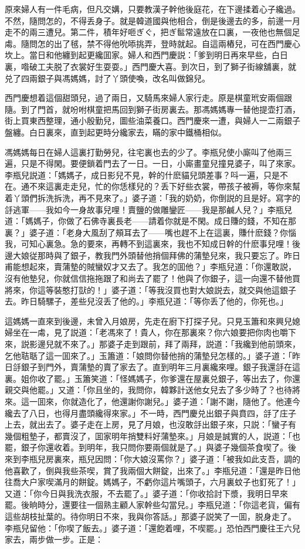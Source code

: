 原來婦人有一件毛病，但凡交媾，只要教漢子幹他後庭花，在下邊揉着心子纔過。不然，隨問怎的，不得丢身子。就是韓道國與他相合，倒是後邊去的多，前邊一月走不的兩三遭兒。第二件，積年好咂ぎぐ，把ぎ䯲常遠放在口裏，一夜他也無個足䖏。隨問怎的出了毧，禁不得他吮㖭挑弄，登時就起。自這兩樁兒，可在西門慶心坎上。當日和他纏到起更纔囬家。婦人和西門慶説：「爹到明日再來早些，白日裏，喒破工夫脱了衣裳好生耍耍。」西門慶大喜。到次日，到了獅子街線舖裏，就兑了四兩銀子與馮媽媽，討了丫頭使喚，改名叫做錦兒。

西門慶想着這個甜頭兒，過了兩日，又騎馬來婦人家行走。原是棋童玳安兩個跟隨。到了門首，就吩咐棋童把馬回到獅子街房裏去。那馮媽媽專一替他提壶打酒，街上買東西整理，通小殷勤兒，圖些油菜養口。西門慶來一遭，與婦人一二兩銀子盤纏。白日裏來，直到起更時分纔家去，瞞的家中鐵桶相似。

馮媽媽每日在婦人這裏打勤勞兒，往宅裏也去的少了。李瓶兒使小廝叫了他兩三遍，只是不得閑。要便鎖着門去了一日。一日，小廝畫童兒撞見婆子，叫了來家。李瓶兒説道：「媽媽子，成日影兒不見，幹的什麽貓兒頭差事？呌一遍，只是不在。通不來這裏走走兒，忙的你恁樣兒的？丢下好些衣裳，帶孩子被褥，等你來幫着丫頭們拆洗拆洗，再不見來了。」婆子道：「我的奶奶，你倒説的且是好。寫字的㧱逃軍——我如今一身故事兒哩！賣鹽的做雕鑾匠——我是那鹹人兒？」李瓶兒道：「媽媽子，你做了石佛寺裏長老——請着你就是不閑。成日賺的錢，不知在那裏？」婆子道：「老身大風刮了頰耳去了——嘴也趕不上在這裏，賺什麽錢？你惱我，可知心裏急。急的要來，再轉不到這裏來，我也不知成日幹的什麽事兒哩！後邊大娘従那時與了銀子，教我門外頭替他捎個拜佛的蒲墊兒來，我只要忘了。昨日甫能想起來，賣蒲墊的賊蠻奴才又去了。我怎的囬他？」李瓶兒道：「你還敢説，沒有他墊兒，你就信信拖拖跟了和尚去了罷了！他與了你銀子，這一向還不替他買將來，你這等裝憨打獃的！」婆子道：「等我沒買也對大娘説去，就交與他這銀子去。昨日騎騾子，差些兒沒丢了他的。」李瓶兒道：「等你丢了他的，你死也。」

這媽媽一直來到後邊，未曾入月娘房，先走在廚下打探子兒。只見玉簫和來興兒媳婦坐在一䖏，見了説道：「老馮來了！貴人，你在那裏來？你六娘要把你肉也嚼下來，説影邊兒就不來了。」那婆子走到跟前，拜了兩拜，説道：「我纔到他前頭來，乞他聐聒了這一囬來了。」玉簫道：「娘問你替他捎的蒲墊兒怎樣的。」婆子道：「昨日㧱銀子到門外，賣蒲墊的賣了家去了。直到明年三月裏纔來哩。銀子我還㧱在這裏。姐你收了罷。」玉簫笑道：「怪媽媽子，你爹還在屋裏兑銀子，等出去了，你還親交與他罷。」又道：「你且坐的，我問你，韓夥計送他女兒去了多少時了？也待將來。這一囬來，你就造化了，他還謝你謝兒。」婆子道：「謝不謝，隨他了。他連今纔去了八日，也得月盡頭纔得來家。」不一時，西門慶兑出銀子與賁四，㧱了庄子上去，就出去了。婆子走在上房，見了月娘，也沒敢㧱出銀子來，只説：「蠻子有幾個粗墊子，都賣沒了，囬家明年捎雙料好蒲墊來。」月娘是誠實的人，説道：「也罷，銀子你還收着。到明年，我只問你要兩個就是了。」與婆子幾個茶食喫了。後來到李瓶兒房裏來，瓶兒因問：「你大娘沒罵你？」婆子道：「被我如此支吾，調的他喜歡了，倒與我些茶喫，賞了我兩個大餅錠，出來了。」李瓶兒道：「還是昨日他往喬大户家喫滿月的餅錠。媽媽子，不虧你這片嘴頭子，六月裏蚊子也釘死了！」又道：「你今日與我洗衣服，不去罷了。」婆子道：「你收拾討下漿，我明日早來罷。後晌時分，還要往一個熟主顧人家幹些勾當兒。」李瓶兒道：「你這老貨，偏有這些胡枝扯葉的。待你明日不來，我與你答話。」那婆子説笑了一囬，脱身走了。李瓶兒留他：「你喫了飯去。」婆子道：「還飽着哩，不喫罷。」恐怕西門慶往王六兒家去，兩步做一步。正是：

